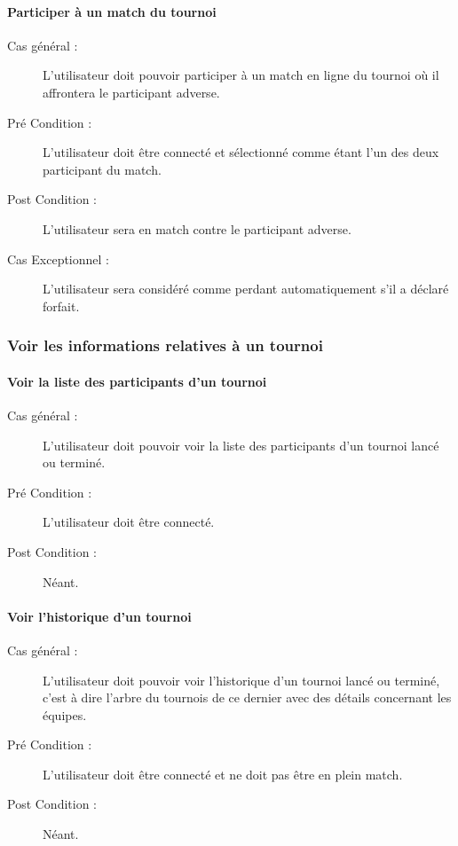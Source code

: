\documentclass[a4paper]{article}
\begin{document}
\paragraph{Participer à un match du tournoi}
\begin{description}
\item[Cas général :] L'\gls{utilisateur} doit pouvoir participer à un match en ligne du tournoi où il affrontera le participant adverse.
\item[Pré Condition  :] L'\gls{utilisateur} doit être connecté et sélectionné comme étant l'un des deux participant du match.
\item[Post Condition :] L'utilisateur sera en match contre le participant adverse.
\item[Cas Exceptionnel :] L'\gls{utilisateur} sera considéré comme perdant automatiquement s'il a déclaré forfait.
\end{description}

\subsubsection{Voir les informations relatives à un tournoi}
\paragraph{Voir la liste des participants d'un tournoi}
\begin{description}
\item[Cas général :] L'\gls{utilisateur} doit pouvoir voir la liste des participants d'un tournoi lancé ou terminé.
\item[Pré Condition  :] L'\gls{utilisateur} doit être connecté.
\item[Post Condition :] Néant.
\end{description}
\paragraph{Voir l'historique d'un tournoi}
\begin{description}
\item[Cas général :] L'\gls{utilisateur} doit pouvoir voir l'historique d'un tournoi lancé ou terminé, c'est à dire l'arbre du tournois de ce dernier avec des détails concernant les équipes.
\item[Pré Condition  :] L'\gls{utilisateur} doit être connecté et ne doit pas être en plein match.
\item[Post Condition :] Néant.
\end{description}
\end{document}
